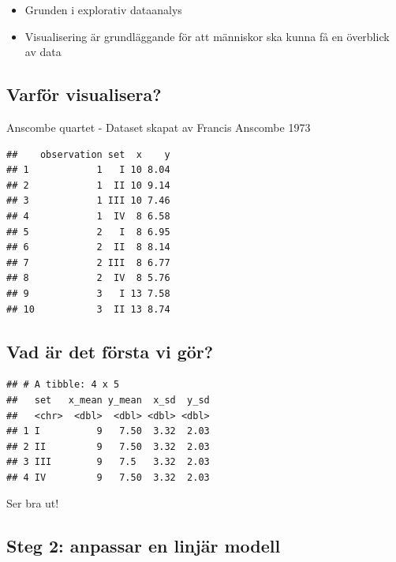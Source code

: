 \documentclass[
]{book}
\begin{document}
\begin{itemize}
\item
  Grunden i explorativ dataanalys
\item
  Visualisering är grundläggande för att människor ska kunna få en överblick av data
\end{itemize}

\hypertarget{varfuxf6r-visualisera}{%
\subsection{Varför visualisera?}\label{varfuxf6r-visualisera}}

Anscombe quartet - Dataset skapat av Francis Anscombe 1973

\begin{verbatim}
##    observation set  x    y
## 1            1   I 10 8.04
## 2            1  II 10 9.14
## 3            1 III 10 7.46
## 4            1  IV  8 6.58
## 5            2   I  8 6.95
## 6            2  II  8 8.14
## 7            2 III  8 6.77
## 8            2  IV  8 5.76
## 9            3   I 13 7.58
## 10           3  II 13 8.74
\end{verbatim}

\hypertarget{vad-uxe4r-det-fuxf6rsta-vi-guxf6r}{%
\subsection{Vad är det första vi gör?}\label{vad-uxe4r-det-fuxf6rsta-vi-guxf6r}}

\begin{verbatim}
## # A tibble: 4 x 5
##   set   x_mean y_mean  x_sd  y_sd
##   <chr>  <dbl>  <dbl> <dbl> <dbl>
## 1 I          9   7.50  3.32  2.03
## 2 II         9   7.50  3.32  2.03
## 3 III        9   7.5   3.32  2.03
## 4 IV         9   7.50  3.32  2.03
\end{verbatim}

Ser bra ut!

\hypertarget{steg-2-anpassar-en-linjuxe4r-modell}{%
\subsection{Steg 2: anpassar en linjär modell}\label{steg-2-anpassar-en-linjuxe4r-modell}}
\end{document}
